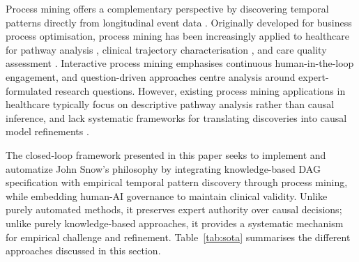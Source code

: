 \documentclass[sn-vancouver-num]{sn-jnl}
\begin{document}
Process mining offers a complementary perspective by discovering temporal patterns directly from longitudinal event data \citep{vanderaalst2016}. Originally developed for business process optimisation, process mining has been increasingly applied to healthcare for pathway analysis \citep{mans2008,rebuge2012,rojas2016,munoz2022}, clinical trajectory characterisation \citep{fernandez2015,kurniati2016,williams2018}, and care quality assessment \citep{ibanez2019}. Interactive process mining \citep{fernandez2020} emphasises continuous human-in-the-loop engagement, and question-driven approaches \citep{rojas2017} centre analysis around expert-formulated research questions. However, existing process mining applications in healthcare typically focus on descriptive pathway analysis rather than causal inference, and lack systematic frameworks for translating discoveries into causal model refinements \citep{chen2023,montoya2025}. 

The closed-loop framework presented in this paper seeks to implement and automatize John Snow's philosophy by integrating knowledge-based DAG specification with empirical temporal pattern discovery through process mining, while embedding human-AI governance to maintain clinical validity. Unlike purely automated methods, it preserves expert authority over causal decisions; unlike purely knowledge-based approaches, it provides a systematic mechanism for empirical challenge and refinement. Table~\ref{tab:sota} summarises the different  approaches discussed in this section. 
\end{document}
